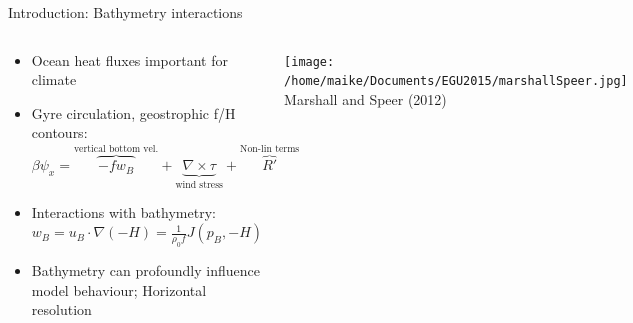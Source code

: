 \documentclass{beamer}
\begin{document}
\begin{frame}{Introduction: Bathymetry interactions}
\begin{columns}[c]
\column{3in}
\centering
\begin{center}
\begin{itemize}%
  \item Ocean heat fluxes important for \alert{climate}
  \item Gyre circulation, geostrophic f/H contours:
  \small$\beta \psi_{x}=\overbrace{-f w_{B}}^{\text{vertical bottom vel.}}+\underbrace{\nabla \times \tau}_{\text{wind stress}} + \overbrace{R'}^{\text{Non-lin terms}}$ \\
  \vspace{15}
  \item Interactions with \alert{bathymetry}:
    $w_{B} = u_{B}\cdot \nabla (-H) = \frac{1}{\rho_{0}f}J(p_{B}, -H)$
  \item Bathymetry can profoundly influence model behaviour; \alert{Horizontal resolution}
\end{itemize}
\end{center}
\column{2in}

\begin{flushright}
\texttt{[image: /home/maike/Documents/EGU2015/marshallSpeer.jpg]}\\
\tiny Marshall and Speer (2012)\end{flushright}
\end{columns}
\end{frame}
\end{document}
